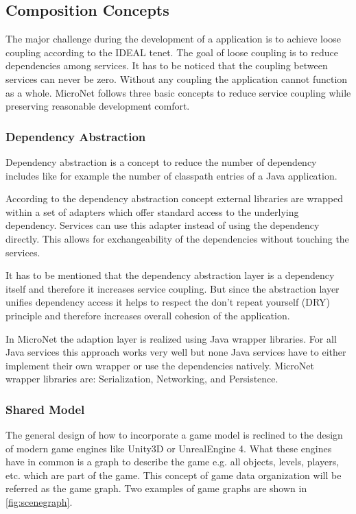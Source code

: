 \subsection{Composition Concepts}

The major challenge during the development of a \ms{} application is to achieve
loose coupling according to the IDEAL tenet. The goal of loose coupling is to
reduce dependencies among services. It has to be noticed that the coupling
between services can never be zero. Without any coupling the application cannot
function as a whole. MicroNet follows three basic concepts to reduce service
coupling while preserving reasonable development comfort.

\subsubsection{Dependency Abstraction}

Dependency abstraction is a concept to reduce the number of dependency
includes like for example the number of classpath entries of a Java application.

According to the dependency abstraction concept external libraries are wrapped
within a set of adapters which offer standard access to the underlying
dependency. Services can use this adapter instead of using the dependency
directly. This allows for exchangeability of the dependencies without touching
the services.

It has to be mentioned that the dependency abstraction layer is a dependency
itself and therefore it increases service coupling. But since the abstraction
layer unifies dependency access it helps to respect the don't repeat yourself (DRY)
principle and therefore increases overall cohesion of the application. 

In MicroNet the adaption layer is realized using Java wrapper libraries. For all
Java services this approach works very well but none Java services have to
either implement their own wrapper or use the dependencies natively. MicroNet
wrapper libraries are: Serialization, Networking, and Persistence.

\subsubsection{Shared Model}
\label{subsub:shared_model}

The general design of how to incorporate a game model \mn{} is reclined to the
design of modern game engines like Unity3D or UnrealEngine 4. What these engines
have in common is a graph to describe the game e.g. all objects, levels,
players, etc. which are part of the game. This concept of game data organization
will be referred as the game graph. Two examples of game graphs are shown in
\autoref{fig:scenegraph}.

